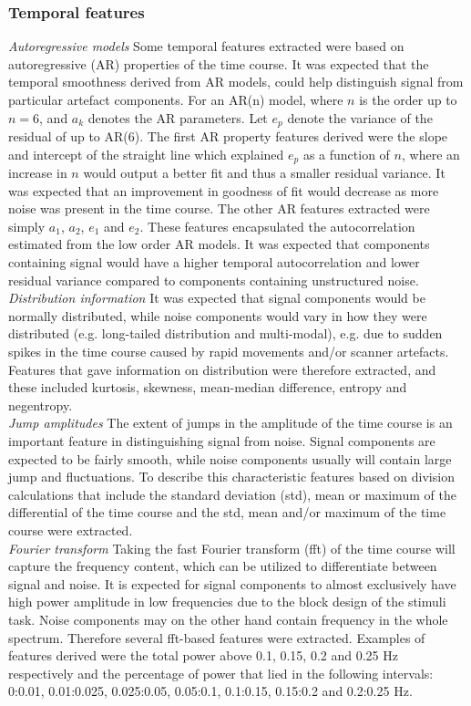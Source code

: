 \subsubsection{Temporal features}
\textit{Autoregressive models} Some temporal features extracted were based on autoregressive (AR) properties of the time course. It was expected that the temporal smoothness derived from AR models, could help distinguish signal from particular artefact components. For an AR(n) model, where $n$ is the order up to $n = 6$, and $a_k$ denotes the AR parameters. Let $e_p$ denote the variance of the residual of up to AR(6). The first AR property features derived were the slope and intercept of the straight line which explained $e_p$ as a function of $n$, where an increase in $n$ would output a better fit and thus a smaller residual variance. It was expected that an improvement in goodness of fit would decrease as more noise was present in the time course. 
The other AR features extracted were simply $a_1$, $a_2$, $e_1$ and $e_2$. These features encapsulated the autocorrelation estimated from the low order AR models. It was expected that components containing signal would have a higher temporal autocorrelation and lower residual variance compared to components containing unstructured noise. \\
\textit{Distribution information} It was expected that signal components would be normally distributed, while noise components would vary in how they were distributed (e.g. long-tailed distribution and multi-modal), e.g. due to sudden spikes in the time course caused by rapid movements and/or scanner artefacts. Features that gave information on distribution were therefore extracted, and these included kurtosis, skewness, mean-median difference, entropy and negentropy. \\
\textit{Jump amplitudes} The extent of jumps in the amplitude of the time course is an important feature in distinguishing signal from noise. Signal components are expected to be fairly smooth, while noise components usually will contain large jump and fluctuations. To describe this characteristic features based on division calculations that include the standard deviation (std), mean or maximum of the differential of the time course and the std, mean and/or maximum of the time course were extracted. \\
\textit{Fourier transform} Taking the fast Fourier transform (fft) of the time course will capture the frequency content, which can be utilized to differentiate between signal and noise. It is expected for signal components to almost exclusively have high power amplitude in low frequencies due to the block design of the stimuli task. Noise components may on the other hand contain frequency in the whole spectrum. Therefore several fft-based features were extracted. Examples of features derived were the total power above 0.1, 0.15, 0.2 and 0.25 Hz respectively and the percentage of power that lied in the following intervals: 0:0.01, 0.01:0.025, 0.025:0.05, 0.05:0.1, 0.1:0.15, 0.15:0.2 and 0.2:0.25 Hz. \\
